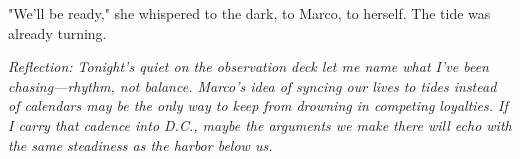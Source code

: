 "We'll be ready," she whispered to the dark, to Marco, to herself. The tide was already turning.

\noindent\textit{Reflection: Tonight's quiet on the observation deck let me name what I've been chasing—rhythm, not balance. Marco's idea of syncing our lives to tides instead of calendars may be the only way to keep from drowning in competing loyalties. If I carry that cadence into D.C., maybe the arguments we make there will echo with the same steadiness as the harbor below us.}
